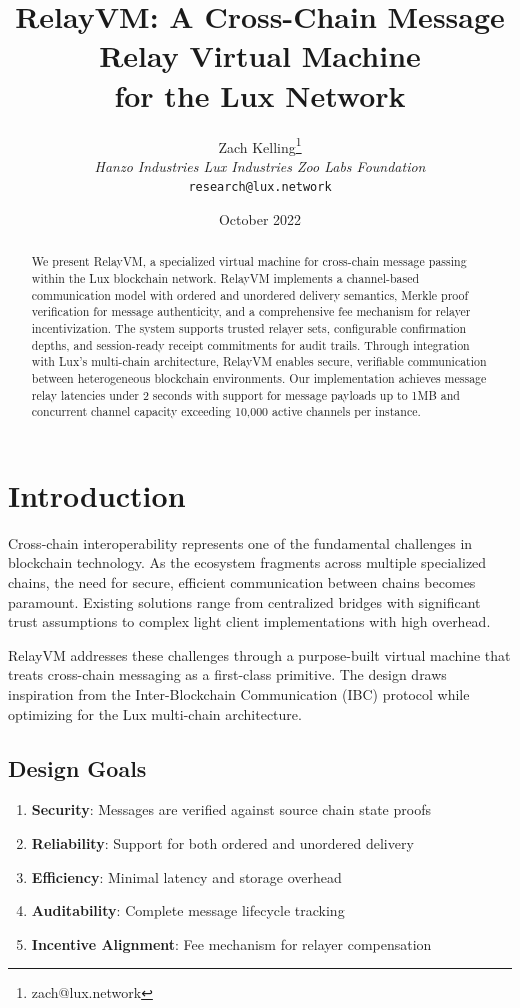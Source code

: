 \documentclass[11pt,twocolumn]{article}
\title{RelayVM: A Cross-Chain Message Relay Virtual Machine\\for the Lux Network}
\author{Zach Kelling\thanks{zach@lux.network} \\ \textit{Hanzo Industries \quad Lux Industries \quad Zoo Labs Foundation} \\ \texttt{research@lux.network}}
\date{October 2022}
\begin{document}
\maketitle

\begin{abstract}
We present RelayVM, a specialized virtual machine for cross-chain message passing within the Lux blockchain network. RelayVM implements a channel-based communication model with ordered and unordered delivery semantics, Merkle proof verification for message authenticity, and a comprehensive fee mechanism for relayer incentivization. The system supports trusted relayer sets, configurable confirmation depths, and session-ready receipt commitments for audit trails. Through integration with Lux's multi-chain architecture, RelayVM enables secure, verifiable communication between heterogeneous blockchain environments. Our implementation achieves message relay latencies under 2 seconds with support for message payloads up to 1MB and concurrent channel capacity exceeding 10,000 active channels per instance.
\end{abstract}

\section{Introduction}

Cross-chain interoperability represents one of the fundamental challenges in blockchain technology. As the ecosystem fragments across multiple specialized chains, the need for secure, efficient communication between chains becomes paramount. Existing solutions range from centralized bridges with significant trust assumptions to complex light client implementations with high overhead.

RelayVM addresses these challenges through a purpose-built virtual machine that treats cross-chain messaging as a first-class primitive. The design draws inspiration from the Inter-Blockchain Communication (IBC) protocol \cite{ibc} while optimizing for the Lux multi-chain architecture.

\subsection{Design Goals}

\begin{enumerate}
\item \textbf{Security}: Messages are verified against source chain state proofs
\item \textbf{Reliability}: Support for both ordered and unordered delivery
\item \textbf{Efficiency}: Minimal latency and storage overhead
\item \textbf{Auditability}: Complete message lifecycle tracking
\item \textbf{Incentive Alignment}: Fee mechanism for relayer compensation
\end{enumerate}
\end{document}
